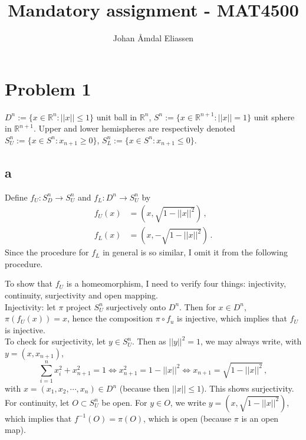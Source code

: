 \documentclass[11pt]{amsart}
\theoremstyle{definition}
\newcommand{\R}{\mathbb{R}}
\numberwithin{equation}{section}
\begin{document}
\author{Johan Åmdal Eliassen}
\title{Mandatory assignment - MAT4500}
\maketitle
\section{Problem 1}
$D^n := \{x \in \R^n: ||x|| \leq 1\}$ unit ball in $\R^n$,
$S^n := \{x \in \R^{n+1}: ||x|| = 1\}$ unit sphere in $\R^{n+1}$. Upper and lower hemispheres are respectively denoted
$S_U^n := \{x\in S^n: x_{n+1} \geq 0\}$,
$S_L^n := \{x\in S^n: x_{n+1} \leq 0\}$.
\subsection*{a}
Define $f_U: S_D^n \to S_U^n$ and $f_L: D^n \to S_U^n$ by
\begin{align}
f_U(x) &= (x, \sqrt{1 - ||x||^2}) \,,\\
f_L(x) &= (x, -\sqrt{1- ||x||^2}) \,.
\end{align}
Since the procedure for $f_L$ in general is so similar, I omit it from the following procedure.

To show that $f_U$ is a homeomorphism, I need to verify four things: injectivity, continuity, surjectivity and open mapping.
\\

Injectivity: let $\pi$ project $S^n_U$ surjectively onto $D^n$. Then for $x\in D^n$, $\pi(f_U(x)) = x$, hence the composition $\pi \circ f_u$ is injective, which implies that $f_U$ is injective.
\\

To check for surjectivity, let $y \in S^n_U$. Then as $||y||^2 = 1$, we may always write, with $y = (x, x_{n+1})$,
\begin{equation}
\sum_{i=1}^n x_i^2 + x_{n+1}^2 = 1
\iff x_{n+1}^2 = 1 - ||x||^2
\iff
x_{n+1} = \sqrt{1 - ||x||^2}\,,
\end{equation}
with $x = (x_1, x_2, \cdots, x_n) \in D^n$ (because then $||x|| \leq 1$). This shows surjectivity.
\\

For continuity, let $O \subset S^n_U$ be open. For $y \in O$, we write $y = (x, \sqrt{1-||x||^2})$, which implies that $f^{-1}(O) = \pi(O)$, which is open (because $\pi$ is an open map).
\\
\end{document}
